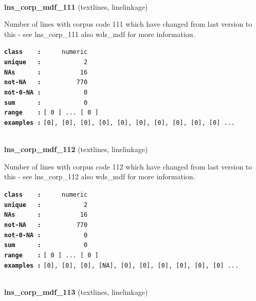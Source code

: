\documentclass[]{article}
\begin{document}
~

\textbf{lns\_corp\_mdf\_111} (textlines, linelinkage)

Number of lines with corpus code 111 which have changed from last
version to this - see lns\_corp\_111 also wds\_mdf for more information.

\textbf{\texttt{class\ \ \ \ :}} \texttt{~~~~~numeric}\\
\textbf{\texttt{unique\ \ \ :}} \texttt{~~~~~~~~~~~2}\\
\textbf{\texttt{NAs\ \ \ \ \ \ :}} \texttt{~~~~~~~~~~16}\\
\textbf{\texttt{not-NA\ \ \ :}} \texttt{~~~~~~~~~770}\\
\textbf{\texttt{not-0-NA\ :}} \texttt{~~~~~~~~~~~0}\\
\textbf{\texttt{sum\ \ \ \ \ \ :}} \texttt{~~~~~~~~~~~0}\\
\textbf{\texttt{range\ \ \ \ :}}
\texttt{{[}\ 0\ {]}\ ...\ {[}\ 0\ {]}}\\
\textbf{\texttt{examples\ :}}
\texttt{{[}0{]},\ {[}0{]},\ {[}0{]},\ {[}0{]},\ {[}0{]},\ {[}0{]},\ {[}0{]},\ {[}0{]},\ {[}0{]},\ {[}0{]}\ ...}\\

~

\textbf{lns\_corp\_mdf\_112} (textlines, linelinkage)

Number of lines with corpus code 112 which have changed from last
version to this - see lns\_corp\_112 also wds\_mdf for more information.

\textbf{\texttt{class\ \ \ \ :}} \texttt{~~~~~numeric}\\
\textbf{\texttt{unique\ \ \ :}} \texttt{~~~~~~~~~~~2}\\
\textbf{\texttt{NAs\ \ \ \ \ \ :}} \texttt{~~~~~~~~~~16}\\
\textbf{\texttt{not-NA\ \ \ :}} \texttt{~~~~~~~~~770}\\
\textbf{\texttt{not-0-NA\ :}} \texttt{~~~~~~~~~~~0}\\
\textbf{\texttt{sum\ \ \ \ \ \ :}} \texttt{~~~~~~~~~~~0}\\
\textbf{\texttt{range\ \ \ \ :}}
\texttt{{[}\ 0\ {]}\ ...\ {[}\ 0\ {]}}\\
\textbf{\texttt{examples\ :}}
\texttt{{[}0{]},\ {[}0{]},\ {[}0{]},\ {[}NA{]},\ {[}0{]},\ {[}0{]},\ {[}0{]},\ {[}0{]},\ {[}0{]},\ {[}0{]}\ ...}\\

~

\textbf{lns\_corp\_mdf\_113} (textlines, linelinkage)
\end{document}
